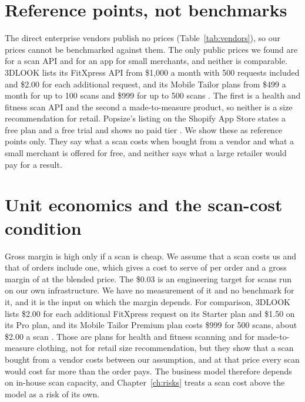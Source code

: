 \section{Reference points, not benchmarks}\label{sec:price-ref}

The direct enterprise vendors publish no prices (Table~\ref{tab:vendors}), so our prices cannot be benchmarked against them. The only public prices we found are for a scan API and for an app for small merchants, and neither is comparable. 3DLOOK lists its FitXpress API from \$1,000 a month with 500 requests included and \$2.00 for each additional request, and its Mobile Tailor plans from \$499 a month for up to 100 scans and \$999 for up to 500 scans \cite{threedlook_pricing}. The first is a health and fitness scan API and the second a made-to-measure product, so neither is a size recommendation for retail. Popsize's listing on the Shopify App Store states a free plan and a free trial and shows no paid tier \cite{popsize_shopify}. We show these as reference points only. They say what a scan costs when bought from a vendor and what a small merchant is offered for free, and neither says what a large retailer would pay for a result.

\section{Unit economics and the scan-cost condition}\label{sec:unit-economics}

Gross margin is high only if a scan is cheap. We assume that a scan costs us  and that  of orders include one, which gives a cost to serve of  per order and a gross margin of  at the blended price. The \$0.03 is an engineering target for scans run on our own infrastructure. We have no measurement of it and no benchmark for it, and it is the input on which the margin depends. For comparison, 3DLOOK lists \$2.00 for each additional FitXpress request on its Starter plan and \$1.50 on its Pro plan, and its Mobile Tailor Premium plan costs \$999 for 500 scans, about \$2.00 a scan \cite{threedlook_pricing}. Those are plans for health and fitness scanning and for made-to-measure clothing, not for retail size recommendation, but they show that a scan bought from a vendor costs between  our assumption, and at that price every scan would cost far more than the order pays. The business model therefore depends on in-house scan capacity, and Chapter~\ref{ch:risks} treats a scan cost above the model as a risk of its own.

